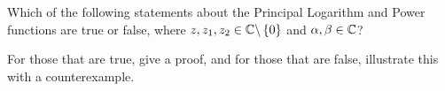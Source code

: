 
\begin{exercise}
\begin{questions}
\question
Which of the following statements about the Principal Logarithm and Power functions are true or false, where $z,z_1,z_2\in \mathbb{C} \backslash \left\{0\right\}$ and $\alpha,\beta \in \mathbb{C}$?  
For those that are true, give a proof, and for those that are false, illustrate this with a counterexample.
\end{questions}
\end{exercise}

